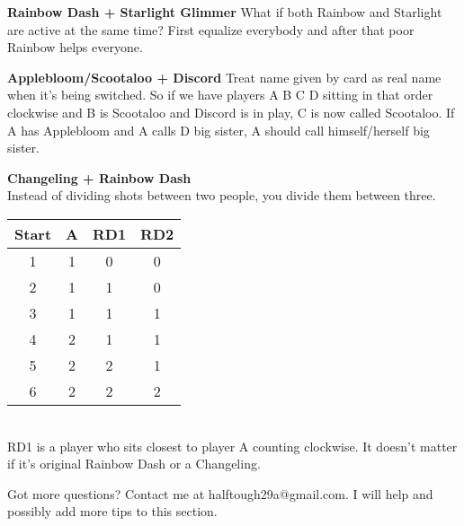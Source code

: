 \documentclass[notitlepage]{article}
\begin{document}
\textbf{Rainbow Dash + Starlight Glimmer}\newline
What if both Rainbow and Starlight are active at the same time? First equalize everybody and after that poor Rainbow helps everyone.

\textbf{Applebloom/Scootaloo + Discord}\newline
Treat name given by card as real name when it's being switched. So if we have players A B C D sitting in that order clockwise and B is Scootaloo and Discord is in play, C is now called Scootaloo. If A has Applebloom and A calls D big sister, A should call himself/herself big sister.

\textbf{Changeling + Rainbow Dash}\\
Instead of dividing shots between two people, you divide them between three.
\begin{tabular}{| c | c | c | c |}
\hline
Start & A & RD1 & RD2 \\ \hline
1 & 1 & 0 & 0 \\ \hline
2 & 1 & 1 & 0 \\ \hline
3 & 1 & 1 & 1 \\ \hline
4 & 2 & 1 & 1 \\ \hline
5 & 2 & 2 & 1 \\ \hline
6 & 2 & 2 & 2 \\ \hline
\end{tabular}\\
RD1 is a player who sits closest to player A counting clockwise. It doesn't matter if it's original Rainbow Dash or a Changeling.

Got more questions? Contact me at halftough29a@gmail.com. I will help and possibly add more tips to this section.
\end{document}
